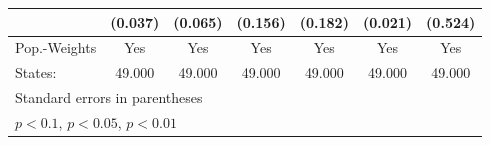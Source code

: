{\begin{tabular}{l*{6}{c}}
            &     (0.037)         &     (0.065)         &     (0.156)         &     (0.182)         &     (0.021)         &     (0.524)         \\
\hline
Pop.-Weights&         Yes         &         Yes         &         Yes         &         Yes         &         Yes         &         Yes         \\
States:     &      49.000         &      49.000         &      49.000         &      49.000         &      49.000         &      49.000         \\
\hline\hline
\multicolumn{7}{l}{\footnotesize Standard errors in parentheses}\\
\multicolumn{7}{l}{\footnotesize \sym{*} \(p<0.1\), \sym{**} \(p<0.05\), \sym{***} \(p<0.01\)}\\
\end{tabular}
}
